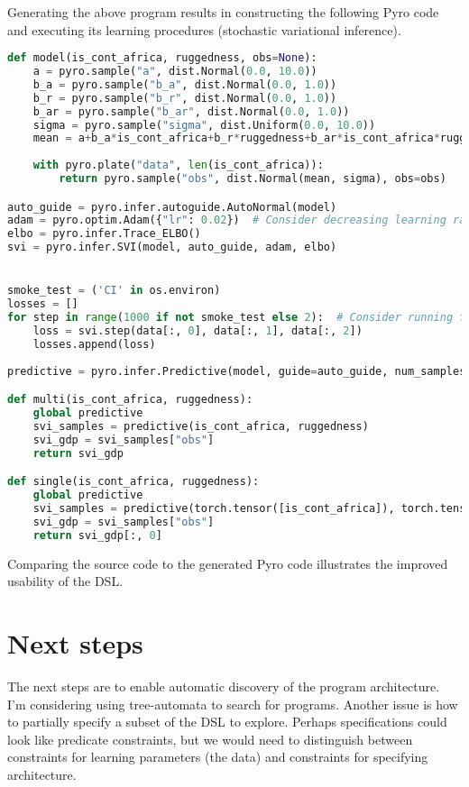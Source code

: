 \documentclass[runningheads]{llncs}
\begin{document}
\noindent
Generating the above program results in constructing the following Pyro code and executing its learning procedures (stochastic variational inference). 
\begin{lstlisting}[language=Python]
def model(is_cont_africa, ruggedness, obs=None):
    a = pyro.sample("a", dist.Normal(0.0, 10.0))
    b_a = pyro.sample("b_a", dist.Normal(0.0, 1.0))
    b_r = pyro.sample("b_r", dist.Normal(0.0, 1.0))
    b_ar = pyro.sample("b_ar", dist.Normal(0.0, 1.0))
    sigma = pyro.sample("sigma", dist.Uniform(0.0, 10.0))
    mean = a+b_a*is_cont_africa+b_r*ruggedness+b_ar*is_cont_africa*ruggedness
    
    with pyro.plate("data", len(is_cont_africa)):
        return pyro.sample("obs", dist.Normal(mean, sigma), obs=obs)

auto_guide = pyro.infer.autoguide.AutoNormal(model)
adam = pyro.optim.Adam({"lr": 0.02})  # Consider decreasing learning rate.
elbo = pyro.infer.Trace_ELBO()
svi = pyro.infer.SVI(model, auto_guide, adam, elbo)


smoke_test = ('CI' in os.environ)
losses = []
for step in range(1000 if not smoke_test else 2):  # Consider running for more steps.
    loss = svi.step(data[:, 0], data[:, 1], data[:, 2])
    losses.append(loss)
        
predictive = pyro.infer.Predictive(model, guide=auto_guide, num_samples=100)

def multi(is_cont_africa, ruggedness):
    global predictive 
    svi_samples = predictive(is_cont_africa, ruggedness)
    svi_gdp = svi_samples["obs"]
    return svi_gdp

def single(is_cont_africa, ruggedness):
    global predictive 
    svi_samples = predictive(torch.tensor([is_cont_africa]), torch.tensor([ruggedness]))
    svi_gdp = svi_samples["obs"]
    return svi_gdp[:, 0]
\end{lstlisting}

\noindent
Comparing the source code to the generated Pyro code illustrates the improved usability of the DSL. 

\section{Next steps}
The next steps are to enable automatic discovery of the program architecture. 
I'm considering using tree-automata to search for programs. 
Another issue is how to partially specify a subset of the DSL to explore. 
Perhaps specifications could look like predicate constraints, but we would need to distinguish between
constraints for learning parameters (the data) and constraints for specifying architecture. 
\end{document}
